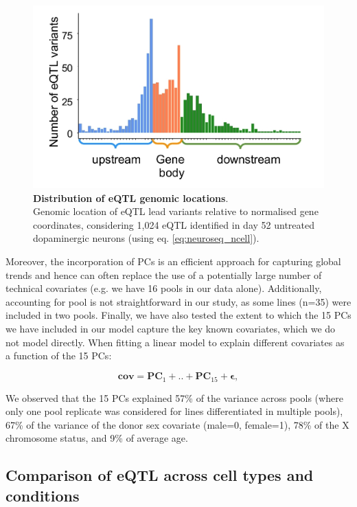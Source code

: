 \begin{figure}[h]
\centering
\includegraphics[width=12cm]{Chapter5/Fig/TSS_distr.jpg}
\caption[Distribution of eQTL genomic locations]{\textbf{Distribution of eQTL genomic locations}.\\
Genomic location of eQTL lead variants relative to normalised gene coordinates, considering 1,024 eQTL identified in day 52 untreated dopaminergic neurons (using eq. \eqref{eq:neuroseq_ncell}).}
\label{fig:neuroseq_eqtl_TSS}
\end{figure}

Moreover, the incorporation of PCs is an efficient approach for capturing global trends and hence can often replace the use of a potentially large number of technical covariates (e.g. we have 16 pools in our data alone).
Additionally, accounting for pool is not straightforward in our study, as some lines (n=35) were included in two pools. 
Finally, we have also tested the extent to which the 15 PCs we have included in our model capture the key known covariates, which we do not model directly. 
When fitting a linear model to explain different covariates as a function of the 15 PCs:

\begin{equation}
    \mathbf{cov} = \mathbf{PC}_1 + .. + \mathbf{PC}_{15} + \boldsymbol{\epsilon},
\end{equation}

We observed that the 15 PCs explained 57\% of the variance across pools (where only one pool replicate was considered for lines differentiated in multiple pools), 67\% of the variance of the donor sex covariate (male=0, female=1), 78\% of the X chromosome status, and 9\% of average age.

\clearpage

\subsection{Comparison of eQTL across cell types and conditions}

